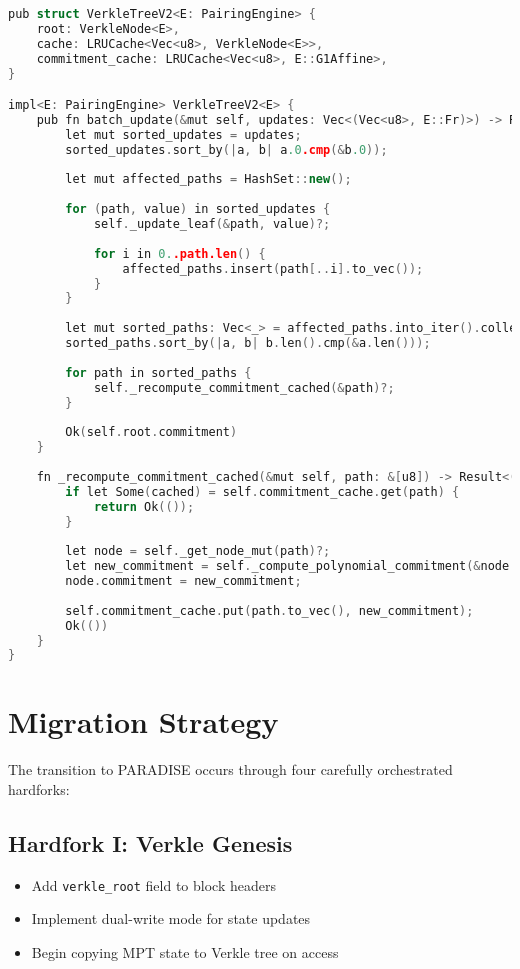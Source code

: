 \documentclass{article}
\begin{document}
\begin{lstlisting}[language=C++,caption={Optimized Verkle Tree with Caching},label={lst:verkle}]
pub struct VerkleTreeV2<E: PairingEngine> {
    root: VerkleNode<E>,
    cache: LRUCache<Vec<u8>, VerkleNode<E>>,
    commitment_cache: LRUCache<Vec<u8>, E::G1Affine>,
}

impl<E: PairingEngine> VerkleTreeV2<E> {
    pub fn batch_update(&mut self, updates: Vec<(Vec<u8>, E::Fr)>) -> Result<E::G1Affine, Error> {
        let mut sorted_updates = updates;
        sorted_updates.sort_by(|a, b| a.0.cmp(&b.0));
        
        let mut affected_paths = HashSet::new();
        
        for (path, value) in sorted_updates {
            self._update_leaf(&path, value)?;
            
            for i in 0..path.len() {
                affected_paths.insert(path[..i].to_vec());
            }
        }
        
        let mut sorted_paths: Vec<_> = affected_paths.into_iter().collect();
        sorted_paths.sort_by(|a, b| b.len().cmp(&a.len()));
        
        for path in sorted_paths {
            self._recompute_commitment_cached(&path)?;
        }
        
        Ok(self.root.commitment)
    }
    
    fn _recompute_commitment_cached(&mut self, path: &[u8]) -> Result<(), Error> {
        if let Some(cached) = self.commitment_cache.get(path) {
            return Ok(());
        }
        
        let node = self._get_node_mut(path)?;
        let new_commitment = self._compute_polynomial_commitment(&node.children)?;
        node.commitment = new_commitment;
        
        self.commitment_cache.put(path.to_vec(), new_commitment);
        Ok(())
    }
}
\end{lstlisting}

\section{Migration Strategy}

The transition to PARADISE occurs through four carefully orchestrated hardforks:

\subsection{Hardfork I: Verkle Genesis}
\begin{itemize}
\item Add \texttt{verkle\_root} field to block headers
\item Implement dual-write mode for state updates
\item Begin copying MPT state to Verkle tree on access
\end{itemize}
\end{document}

